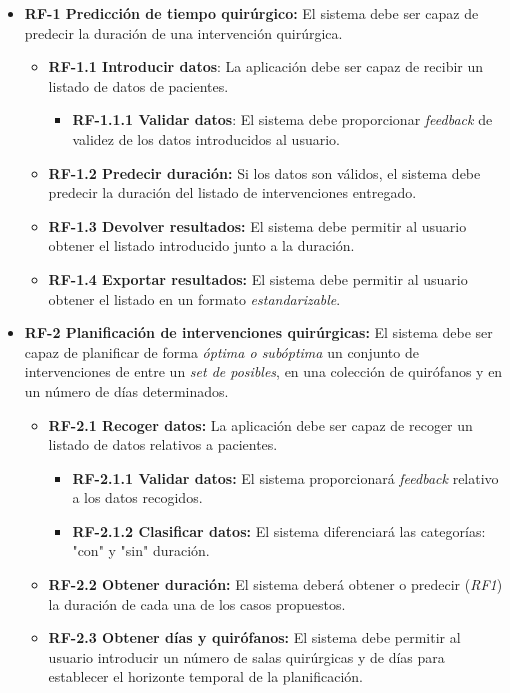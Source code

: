 \begin{itemize}
    \item \textbf{RF-1 Predicción de tiempo quirúrgico:} El sistema debe ser capaz de predecir la duración de una intervención quirúrgica.
    \begin{itemize}
        \item \textbf{RF-1.1 Introducir datos}: La aplicación debe ser capaz de recibir un listado de datos de pacientes.
        \begin{itemize}
            \item \textbf{RF-1.1.1 Validar datos}: El sistema debe proporcionar \textit{feedback} de validez de los datos introducidos al usuario.
\end{itemize}
\item \textbf{RF-1.2 Predecir duración:} Si los datos son válidos, el sistema debe predecir la duración del listado de intervenciones entregado.
\item \textbf{RF-1.3 Devolver resultados:} El sistema debe permitir al usuario obtener el listado introducido junto a la duración.
\item \textbf{RF-1.4 Exportar resultados:} El sistema debe permitir al usuario obtener el listado en un formato \textit{estandarizable}.
    \end{itemize}
    \item \textbf{RF-2 Planificación de intervenciones quirúrgicas:} El sistema debe ser capaz de planificar de forma \textit{óptima o subóptima} un conjunto de intervenciones de entre un \textit{set de posibles}, en una colección de quirófanos y en un número de días determinados.
    \begin{itemize}
        \item \textbf{RF-2.1 Recoger datos:} La aplicación debe ser capaz de recoger un listado de datos relativos a pacientes.
        \begin{itemize}
            \item \textbf{RF-2.1.1 Validar datos:} El sistema proporcionará \textit{feedback} relativo a los datos recogidos.
            \item \textbf{RF-2.1.2 Clasificar datos:} El sistema diferenciará las categorías: "con" y "sin" duración.
        \end{itemize}
        \item \textbf{RF-2.2 Obtener duración:} El sistema deberá obtener o predecir (\textit{RF1}) la duración de cada una de los casos propuestos.
        \item \textbf{RF-2.3 Obtener días y quirófanos:} El sistema debe permitir al usuario introducir un número de salas quirúrgicas y de días para establecer el horizonte temporal de la planificación.

\end{itemize}
\end{itemize}
